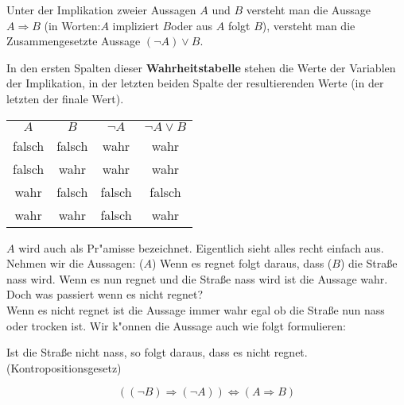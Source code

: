 \begin{definition}[Implikation]
Unter der Implikation zweier Aussagen $A$ und $B$ versteht man die Aussage $A \Rightarrow B$ (in Worten:\glqq $A$ impliziert $B$\grqq oder \glqq aus $A$ folgt $B$\grqq ), versteht man die Zusammengesetzte Aussage $ (\neg A) \lor B$.
\end{definition}
In den ersten Spalten dieser \textbf{Wahrheitstabelle} stehen die Werte der Variablen der Implikation, in der letzten beiden Spalte der resultierenden Werte (in der letzten der finale Wert).
\begin{center}
\begin{tabular}{c|c||c||c}
$A$& $B$ &$\neg A$&  $\neg A \lor B$  \\ 
 \cellcolor{ared}falsch &  \cellcolor{ared}falsch & \cellcolor{agreen}wahr  & \cellcolor{agreen}wahr  \\ 
 \cellcolor{ared}falsch & \cellcolor{agreen}wahr & \cellcolor{agreen}wahr  &  \cellcolor{agreen}wahr  \\ 
\cellcolor{agreen}wahr &  \cellcolor{ared}falsch & \cellcolor{ared} falsch  &  \cellcolor{ared}falsch  \\ 
\cellcolor{agreen}wahr & \cellcolor{agreen}wahr & \cellcolor{ared} falsch  &  \cellcolor{agreen}wahr  \\ 
\hline
\end{tabular}
\end{center}

$A$ wird auch als Pr"amisse bezeichnet. Eigentlich sieht alles recht einfach aus. Nehmen wir die Aussagen: ($A$) \glqq Wenn es regnet folgt daraus, dass ($B$) die Stra{\ss}e nass wird\grqq . Wenn es nun regnet und die Stra{\ss}e nass wird ist die Aussage wahr. Doch was passiert wenn es nicht regnet?\\
Wenn es nicht regnet ist die Aussage immer wahr egal ob die Stra{\ss}e nun nass oder trocken ist.
Wir k"onnen die Aussage auch wie folgt formulieren:
\begin{center}
\glqq Ist die Stra{\ss}e nicht nass, so folgt daraus, dass es nicht regnet.\grqq\\ (Kontropositionsgesetz)
\end{center}
\begin{equation*}
((\neg B) \Rightarrow (\neg A)) \iff (A \Rightarrow B)
\end{equation*}

